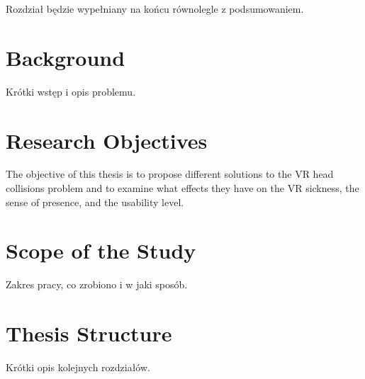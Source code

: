 Rozdział będzie wypełniany na końcu równolegle z podsumowaniem.

\section{Background}

Krótki wstęp i opis problemu.

\section{Research Objectives}

The objective of this thesis is to propose different solutions to the VR head collisions problem and to examine what effects they have on the VR sickness, the sense of presence, and the usability level.

\section{Scope of the Study}

Zakres pracy, co zrobiono i w jaki sposób.

\section{Thesis Structure}

Krótki opis kolejnych rozdziałów.
